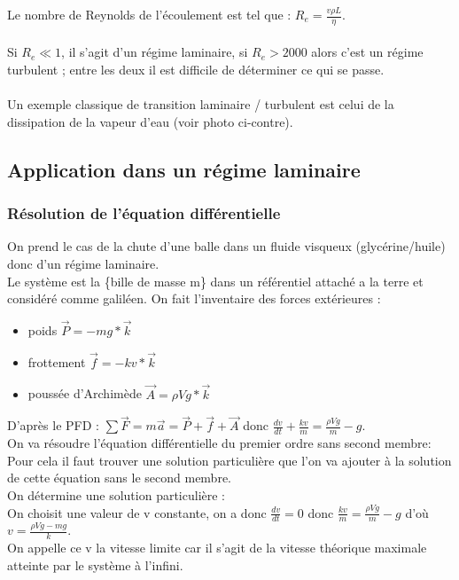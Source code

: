 \documentclass[a4paper,10pt]{book}
\begin{document}
Le nombre de Reynolds de l’écoulement est tel que : $R_{e}=\frac{v\rho L}{\eta}$.\\\\

Si $R_{e}\ll 1$, il s'agit d'un régime laminaire, si $R_{e}>2000$ alors c'est un régime turbulent ; entre les deux il est difficile de déterminer ce qui se passe.\\\\
Un exemple classique de transition laminaire / turbulent est celui de la dissipation de la vapeur d’eau (voir photo ci-contre).

\newpage

\subsection{Application dans un régime laminaire}
\subsubsection{Résolution de l’équation différentielle}
On prend le cas de la chute d'une balle dans un fluide visqueux (glycérine/huile) donc d'un régime laminaire.\\

Le système est la \{bille de masse m\} dans un référentiel attaché a la terre et considéré comme galiléen.
On fait l'inventaire des forces extérieures : \begin{itemize}\renewcommand{\labelitemi}{$\bullet$}
\item poids $\vec{P}=-mg*\vec{k}$
\item frottement $\vec{f}=-kv*\vec{k}$
\item poussée d'Archimède $\vec{A}=\rho Vg*\vec{k}$\\ \end{itemize}

D'après le PFD : $\sum \vec{F}=m\vec{a}=\vec{P}+\vec{f}+\vec{A}$ donc $\frac{dv}{dt}+\frac{kv}{m}=\frac{\rho Vg}{m}-g$.\\

On va résoudre l'équation différentielle du premier ordre sans second membre:\\
Pour cela il faut trouver une solution particulière que l'on va ajouter à la solution de cette équation sans le second membre.\\

On détermine une solution particulière :\\
On choisit une valeur de v constante, on a donc $\frac{dv}{dt}=0$ donc $\frac{kv}{m}=\frac{\rho Vg}{m}-g$ d'où $v=\frac{\rho Vg-mg}{k}$.\\
On appelle ce v la vitesse limite car il s'agit de la vitesse théorique maximale atteinte par le système à l'infini.\\
\end{document}
